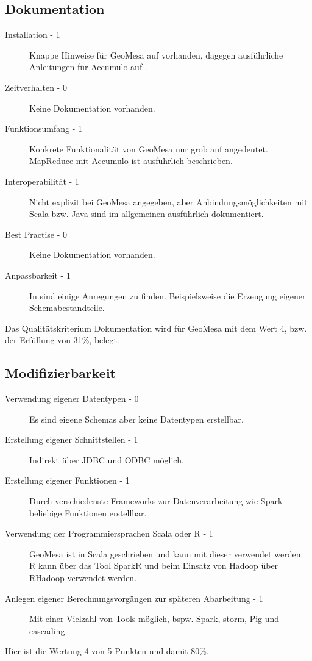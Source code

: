 \subsection{Dokumentation}
\begin{description}
\item[Installation - 1] Knappe Hinweise für GeoMesa auf \cite{website:geomesa-quickstart} vorhanden, dagegen ausführliche Anleitungen für Accumulo auf \cite{website:accumulo-manual}.
\item[Zeitverhalten - 0] Keine Dokumentation vorhanden. %
\item[Funktionsumfang - 1] Konkrete Funktionalität von GeoMesa nur grob auf \cite{website:geomesa-tutorials} angedeutet. MapReduce mit Accumulo ist ausführlich beschrieben. \cite{website:accumulo-manual}
\item[Interoperabilität - 1] Nicht explizit bei GeoMesa angegeben, aber Anbindungsmöglichkeiten mit Scala bzw. Java sind im allgemeinen ausführlich dokumentiert.
\item[Best Practise - 0] Keine Dokumentation vorhanden.
\item[Anpassbarkeit - 1] In \cite{website:geomesa-tutorials} sind einige Anregungen zu finden. Beispielsweise die Erzeugung eigener Schemabestandteile. \cite{website:geomesa-simplefeatures}
\end{description}
Das Qualitätskriterium Dokumentation wird für GeoMesa mit dem Wert 4, bzw. der Erfüllung von 31\%,  belegt.

\subsection{Modifizierbarkeit}
\begin{description}
\item[Verwendung eigener Datentypen - 0] Es sind eigene Schemas aber keine Datentypen erstellbar. \cite{website:geomesa-simplefeatures}
\item[Erstellung eigener Schnittstellen - 1] Indirekt über JDBC und ODBC möglich.
\item[Erstellung eigener Funktionen - 1] Durch verschiedenste Frameworks zur Datenverarbeitung wie Spark beliebige Funktionen erstellbar.
\item[Verwendung der Programmiersprachen Scala oder R - 1] GeoMesa ist in Scala geschrieben und kann mit dieser verwendet werden. R kann über das Tool SparkR und beim Einsatz von Hadoop über RHadoop verwendet werden.
\item[Anlegen eigener Berechnungsvorgängen zur späteren Abarbeitung - 1] Mit einer Vielzahl von Tools möglich, bspw. Spark, \Gls{storm}, Pig und \Gls{cascading}.
\end{description}
Hier ist die Wertung 4 von 5 Punkten und damit 80\%.

